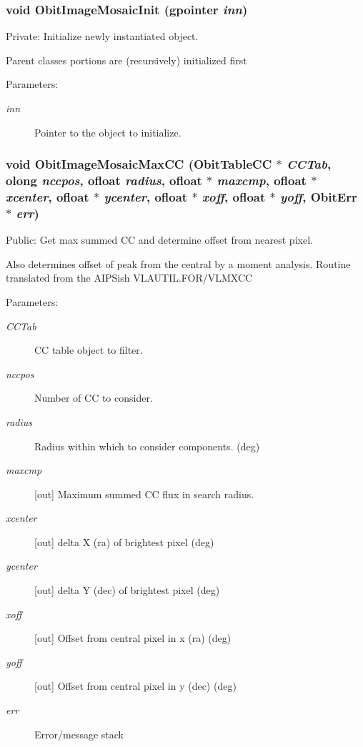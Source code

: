 \subsubsection{\setlength{\rightskip}{0pt plus 5cm}void Obit\-Image\-Mosaic\-Init (gpointer {\em inn})}\label{ObitImageMosaic_8c_a4}


Private: Initialize newly instantiated object. 

Parent classes portions are (recursively) initialized first \begin{Desc}
\item[Parameters:]
\begin{description}
\item[{\em inn}]Pointer to the object to initialize. \end{description}
\end{Desc}
\subsubsection{\setlength{\rightskip}{0pt plus 5cm}void Obit\-Image\-Mosaic\-Max\-CC ({\bf Obit\-Table\-CC} $\ast$ {\em CCTab}, {\bf olong} {\em nccpos}, {\bf ofloat} {\em radius}, {\bf ofloat} $\ast$ {\em maxcmp}, {\bf ofloat} $\ast$ {\em xcenter}, {\bf ofloat} $\ast$ {\em ycenter}, {\bf ofloat} $\ast$ {\em xoff}, {\bf ofloat} $\ast$ {\em yoff}, {\bf Obit\-Err} $\ast$ {\em err})}\label{ObitImageMosaic_8c_a28}


Public: Get max summed CC and determine offset from nearest pixel. 

Also determines offset of peak from the central by a moment analysis. Routine translated from the AIPSish VLAUTIL.FOR/VLMXCC \begin{Desc}
\item[Parameters:]
\begin{description}
\item[{\em CCTab}]CC table object to filter. \item[{\em nccpos}]Number of CC to consider. \item[{\em radius}]Radius within which to consider components. (deg) \item[{\em maxcmp}][out] Maximum summed CC flux in search radius. \item[{\em xcenter}][out] delta X (ra) of brightest pixel (deg) \item[{\em ycenter}][out] delta Y (dec) of brightest pixel (deg) \item[{\em xoff}][out] Offset from central pixel in x (ra) (deg) \item[{\em yoff}][out] Offset from central pixel in y (dec) (deg) \item[{\em err}]Error/message stack \end{description}
\end{Desc}
